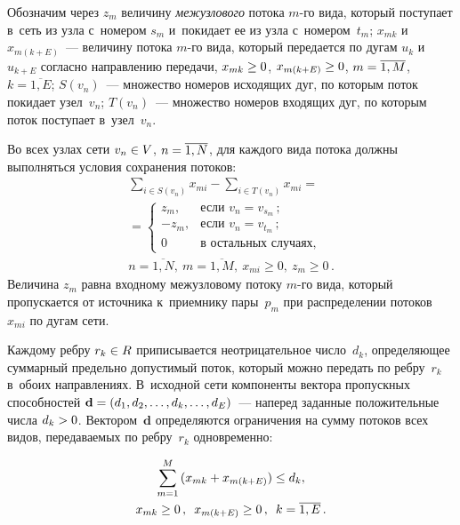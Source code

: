 \begin{multicols}{2}
Обозначим через $z_m$ величину \textit{межузлового} потока $m$-го вида, 
который поступает в~сеть из узла с~номером $s_m$ и~покидает ее из узла с~номером~$t_m$;
$x_{mk}$ и~$x_{m(k + E)}$~--- величину потока $m$-го вида, который передается 
по дугам $u_k$ и~$u_{k + E}$ согласно на\-прав\-ле\-нию передачи, $x_{mk} \hm\geq 
0$, $x_{m(k + E)}\hm\geq 0$, $m \hm=  \overline{1, M}$, $k =  \overline {1, 
E}$;
$S(v_n)$~--- множество номеров исходящих дуг, по которым поток покидает 
узел~$v_n$;
$T(v_n)$~--- множество номеров входящих дуг, по которым поток поступает 
в~узел~$v_n$.

Во всех узлах сети $v_n \hm\in V$, $n \hm=  \overline{1,N}$,  для каж\-до\-го 
вида потока должны выполняться условия сохранения потоков:
\begin{multline}
\sum\limits_{i \in S(v_n)}{x_{mi}} - \sum\limits_{i \in T(v_n)}{x_{mi}} ={}\\
{}=
\begin{cases}
z_m, & \mbox{если } v_n = v_{s_m}\,; \\
- z_m, & \mbox{если } v_n = v_{t_m}\,; \\
 0 & \mbox{в остальных случаях},
\end{cases}\\
n =  \overline {1, N}, \ m =  \overline {1, M}, \ x_{mi} \geq 0, \ z_m \geq 0\,.
\label{e1-m}
\end{multline}
Величина $z_m$ равна входному межузловому потоку $m$-го вида, который 
пропускается от источника к~приемнику пары~$p_m$ при распределении  
потоков~$x_{mi}$ по дугам сети.

Каждому ребру $r_k\hm \in R$ приписывается неотрицательное число~$d_k$, 
определяющее суммарный предельно допустимый поток, который можно передать по 
ребру~$r_k$ в~обоих направлениях. В~исходной сети компоненты вектора 
пропускных способностей $\mathbf{d} \hm= (d_1, d_2, \ldots, d_k, \ldots, 
d_E)$~--- наперед заданные положительные числа $d_k \hm> 0$. 
Вектором~$\mathbf{d}$ определяются ограничения на сумму потоков всех видов, 
передаваемых по ребру~$r_k$ одновременно:

\vspace*{-6pt}

\noindent
\begin{multline}
\sum\limits_{m=1}^{M} {(x_{mk}+ x_{m(k+E)})} \le d_k,  \\
 x_{mk} \geq 0\,, \enskip  
x_{m(k+E)} \geq 0\,, \enskip  k = \overline{1, E}\,. 
\label{e2-m}
\end{multline}


\end{multicols}

